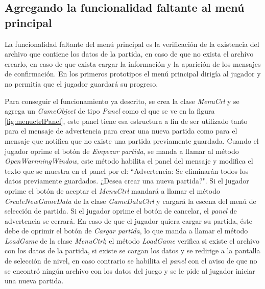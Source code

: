 \subsection{Agregando la funcionalidad faltante al menú principal}
La funcionalidad faltante del menú principal es la verificación de la existencia
del archivo que contiene los datos de la partida, en caso de que no exista el
archivo crearlo, en caso de que exista cargar la información y la aparición de
los mensajes de confirmación. En los primeros prototipos el menú principal
dirigía al jugador y no permitía que el jugador guardará su progreso.
\\
\par
Para conseguir el funcionamiento ya descrito, se crea la clase \textit{MenuCrl}
y se agrega un \textit{GameObject} de tipo \textit{Panel} como el que se ve en
la figura \ref{fig:menuctrlPanel}, este panel tiene esa estructura a fin de ser
utilizado tanto para el mensaje de advertencia para crear una nueva partida como
para el mensaje que notifica que no existe una partida previamente guardada.
Cuando el jugador oprime el botón de \textit{Empezar partida}, se manda a llamar
al método \textit{OpenWarnningWindow}, este método habilita el panel del mensaje
y modifica el texto que se muestra en el panel por el: “Advertencia: Se
eliminarán todos los datos previamente guardados. ¿Desea crear una nueva
partida?". Si el jugador oprime el botón de aceptar el \textit{MenuCtrl} mandará
a llamar el método \textit{CreateNewGameData} de la clase \textit{GameDataCtrl}
y cargará la escena del menú de selección de partida. Si el jugador oprime el
botón de cancelar, el \textit{panel} de advertencia se cerrará. En caso de que
el jugador quiera cargar su partida, éste debe de oprimir el botón de
\textit{Cargar partida}, lo que manda a llamar el método \textit{LoadGame} de la
clase \textit{MenuCtrl}; el método \textit{LoadGame} verifica si existe el
archivo con los datos de la partida, si existe se cargan los datos y se redirige
a la pantalla de selección de nivel, en caso contrario se habilita el
\textit{panel} con el aviso de que no se encontró ningún archivo con los datos
del juego y se le pide al jugador iniciar una nueva partida.

